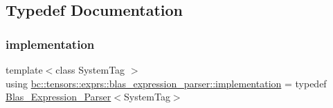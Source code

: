 \subsection{Typedef Documentation}
\mbox{\label{namespacebc_1_1tensors_1_1exprs_1_1blas__expression__parser_a26796b5f514fb9e0f22e55339e432419}} 
\subsubsection{\texorpdfstring{implementation}{implementation}}
{\footnotesize\ttfamily template$<$class System\+Tag $>$ \\
using \hyperlink{namespacebc_1_1tensors_1_1exprs_1_1blas__expression__parser_a26796b5f514fb9e0f22e55339e432419}{bc\+::tensors\+::exprs\+::blas\+\_\+expression\+\_\+parser\+::implementation} = typedef \hyperlink{structbc_1_1tensors_1_1exprs_1_1blas__expression__parser_1_1Blas__Expression__Parser}{Blas\+\_\+\+Expression\+\_\+\+Parser}$<$System\+Tag$>$}

